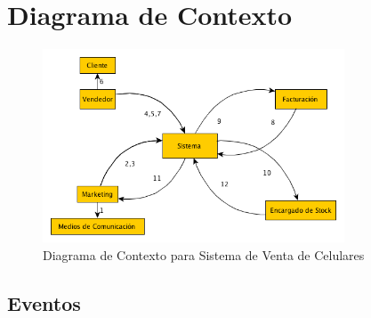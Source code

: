 \section{Diagrama de Contexto}

\begin{figure}[h!]
  	\centering
	\includegraphics[width=0.8\textwidth]{./imagenes/diagrama_contexto.png}
	\caption{Diagrama de Contexto para Sistema de Venta de Celulares}
\end{figure}

\subsection{Eventos}

